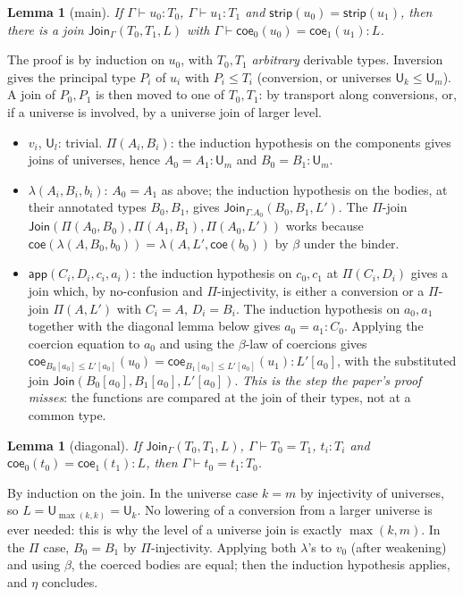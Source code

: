 \documentclass[10pt]{article}
\newcommand{\U}{\mathsf{U}}
\newcommand{\lam}{\lambda}
\newcommand{\app}{\mathsf{app}}
\newcommand{\strip}{\mathsf{strip}}
\newtheorem{lemma}[theorem]{Lemma}
\theoremstyle{remark}
\begin{document}
\begin{lemma}[main]
If $\Gamma\vdash u_0:T_0$, $\Gamma\vdash u_1:T_1$ and
$\strip(u_0)=\strip(u_1)$, then there is a join
$\mathsf{Join}_\Gamma(T_0,T_1,L)$ with
$\Gamma\vdash\mathsf{coe}_0(u_0)=\mathsf{coe}_1(u_1):L$.
\end{lemma}
\noindent
The proof is by induction on $u_0$, with $T_0,T_1$ \emph{arbitrary} derivable
types.  Inversion gives the principal type $P_i$ of $u_i$ with
$P_i\le T_i$ (conversion, or universes $\U_k\le\U_m$).  A join of $P_0,P_1$
is then moved to one of $T_0,T_1$: by transport along conversions, or,
if a universe is involved, by a universe join of larger level.
\begin{itemize}
\item $v_i$, $\U_l$: trivial.  $\Pi(A_i,B_i)$: the induction hypothesis on
  the components gives joins of universes, hence $A_0=A_1:\U_m$ and
  $B_0=B_1:\U_m$.
\item $\lam(A_i,B_i,b_i)$: $A_0=A_1$ as above; the induction hypothesis on
  the bodies, at their annotated types $B_0,B_1$, gives
  $\mathsf{Join}_{\Gamma.A_0}(B_0,B_1,L')$.  The $\Pi$-join
  $\mathsf{Join}(\Pi(A_0,B_0),\Pi(A_1,B_1),\Pi(A_0,L'))$ works because
  $\mathsf{coe}(\lam(A,B_0,b_0))=\lam(A,L',\mathsf{coe}(b_0))$ by $\beta$
  under the binder.
\item $\app(C_i,D_i,c_i,a_i)$: the induction hypothesis on $c_0,c_1$ at
  $\Pi(C_i,D_i)$ gives a join which, by no-confusion and $\Pi$-injectivity,
  is either a conversion or a $\Pi$-join $\Pi(A,L')$ with $C_i=A$, $D_i=B_i$.
  The induction hypothesis on $a_0,a_1$ together with the diagonal lemma
  below gives $a_0=a_1:C_0$.  Applying the coercion equation to $a_0$ and
  using the $\beta$-law of coercions gives
  $\mathsf{coe}_{B_0[a_0]\le L'[a_0]}(u_0)=\mathsf{coe}_{B_1[a_0]\le L'[a_0]}(u_1):L'[a_0]$,
  with the substituted join $\mathsf{Join}(B_0[a_0],B_1[a_0],L'[a_0])$.
  \emph{This is the step the paper's proof misses}: the functions are
  compared at the join of their types, not at a common type.
\end{itemize}

\begin{lemma}[diagonal]
If $\mathsf{Join}_\Gamma(T_0,T_1,L)$, $\Gamma\vdash T_0=T_1$, $t_i:T_i$ and
$\mathsf{coe}_0(t_0)=\mathsf{coe}_1(t_1):L$, then $\Gamma\vdash t_0=t_1:T_0$.
\end{lemma}
\noindent
By induction on the join.  In the universe case $k=m$ by injectivity of
universes, so $L=\U_{\max(k,k)}=\U_k$.  No lowering of a conversion from a
larger universe is ever needed: this is why the level of a universe join is
exactly $\max(k,m)$.  In the $\Pi$ case, $B_0=B_1$ by $\Pi$-injectivity.
Applying both $\lam$'s to $v_0$ (after weakening) and using $\beta$, the
coerced bodies are equal; then the induction hypothesis applies, and $\eta$
concludes.
\end{document}
